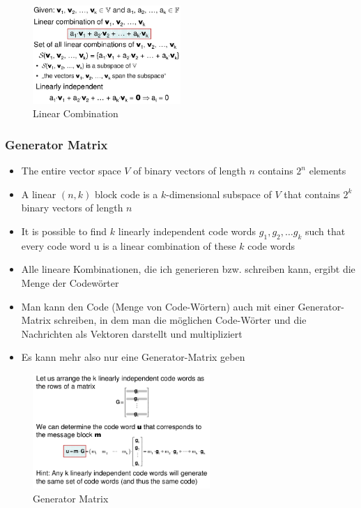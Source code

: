\begin{figure}[H]
\centering
\includegraphics[width=0.5\textwidth]{figures/linearKombination.png}
\caption{Linear Combination}
\end{figure}

\hypertarget{generator-matrix}{%
\subsubsection{Generator Matrix}\label{generator-matrix}}

\begin{itemize}
\item
  The entire vector space $V$ of binary vectors of length $n$ contains $2^n$
  elements
\item
  A linear $(n, k)$ block code is a $k$-dimensional subspace of $V$ that
  contains $2^k$ binary vectors of length $n$
\item
  It is possible to find $k$ linearly independent code words $g_1 , g_2 ,
  \ldots{} g_k$ such that every code word u is a linear combination of
  these $k$ code words
\item
  Alle lineare Kombinationen, die ich generieren bzw. schreiben kann,
  ergibt die Menge der Codewörter
\item
  Man kann den Code (Menge von Code-Wörtern) auch mit einer
  Generator-Matrix schreiben, in dem man die möglichen Code-Wörter und
  die Nachrichten als Vektoren darstellt und multipliziert
\item
  Es kann mehr also nur eine Generator-Matrix geben
\end{itemize}

\begin{figure}[H]
\centering
\includegraphics[width=0.6\textwidth]{figures/generatorMatrix.png}
\caption{Generator Matrix}
\end{figure}

